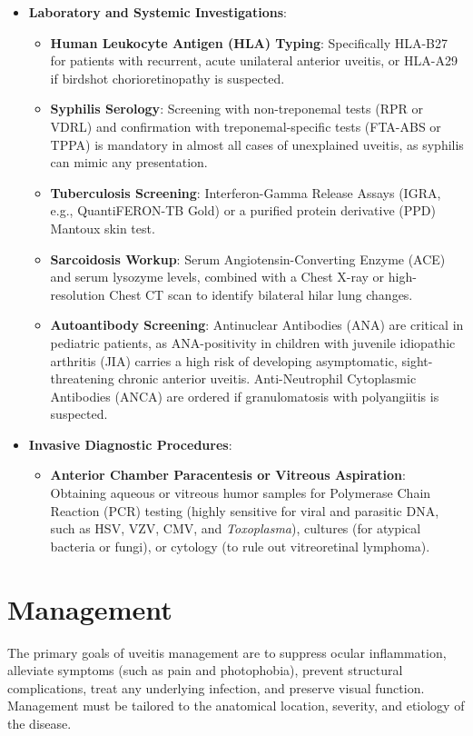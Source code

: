 \begin{itemize}
\begin{itemize}
    \end{itemize}
    \item \textbf{Laboratory and Systemic Investigations}:
    \begin{itemize}
        \item \textbf{Human Leukocyte Antigen (HLA) Typing}: Specifically HLA-B27 for patients with recurrent, acute unilateral anterior uveitis, or HLA-A29 if birdshot chorioretinopathy is suspected.
        \item \textbf{Syphilis Serology}: Screening with non-treponemal tests (RPR or VDRL) and confirmation with treponemal-specific tests (FTA-ABS or TPPA) is mandatory in almost all cases of unexplained uveitis, as syphilis can mimic any presentation.
        \item \textbf{Tuberculosis Screening}: Interferon-Gamma Release Assays (IGRA, e.g., QuantiFERON-TB Gold) or a purified protein derivative (PPD) Mantoux skin test.
        \item \textbf{Sarcoidosis Workup}: Serum Angiotensin-Converting Enzyme (ACE) and serum lysozyme levels, combined with a Chest X-ray or high-resolution Chest CT scan to identify bilateral hilar lung changes.
        \item \textbf{Autoantibody Screening}: Antinuclear Antibodies (ANA) are critical in pediatric patients, as ANA-positivity in children with juvenile idiopathic arthritis (JIA) carries a high risk of developing asymptomatic, sight-threatening chronic anterior uveitis. Anti-Neutrophil Cytoplasmic Antibodies (ANCA) are ordered if granulomatosis with polyangiitis is suspected.
    \end{itemize}
    \item \textbf{Invasive Diagnostic Procedures}:
    \begin{itemize}
        \item \textbf{Anterior Chamber Paracentesis or Vitreous Aspiration}: Obtaining aqueous or vitreous humor samples for Polymerase Chain Reaction (PCR) testing (highly sensitive for viral and parasitic DNA, such as HSV, VZV, CMV, and \textit{Toxoplasma}), cultures (for atypical bacteria or fungi), or cytology (to rule out vitreoretinal lymphoma).
    \end{itemize}
\end{itemize}

\section*{Management}
The primary goals of uveitis management are to suppress ocular inflammation, alleviate symptoms (such as pain and photophobia), prevent structural complications, treat any underlying infection, and preserve visual function. Management must be tailored to the anatomical location, severity, and etiology of the disease.

